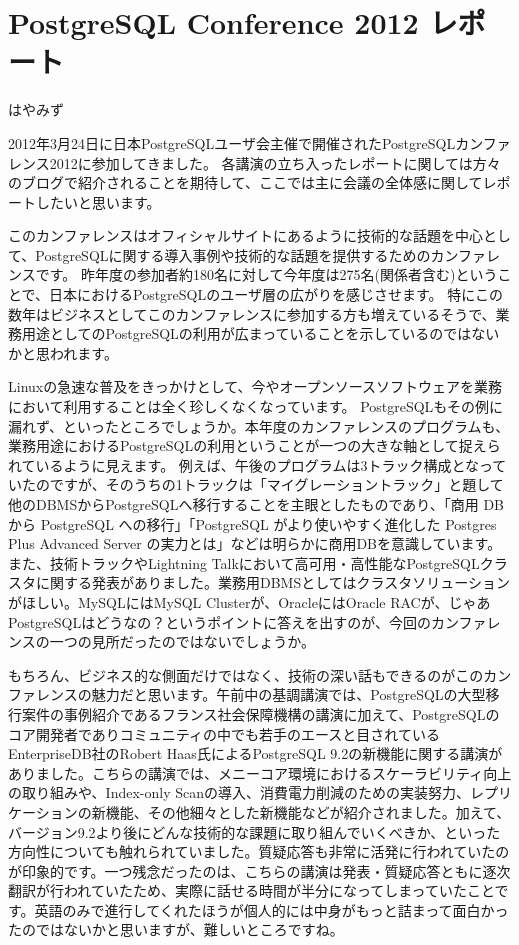 

\chapter{PostgreSQL Conference 2012 レポート}

\begin{flushright}
 はやみず
\end{flushright}

2012年3月24日に日本PostgreSQLユーザ会主催で開催されたPostgreSQLカンファレンス2012に参加してきました。 各講演の立ち入ったレポートに関しては方々のブログで紹介されることを期待して、ここでは主に会議の全体感に関してレポートしたいと思います。

このカンファレンスはオフィシャルサイトにあるように技術的な話題を中心として、PostgreSQLに関する導入事例や技術的な話題を提供するためのカンファレンスです。 昨年度の参加者約180名に対して今年度は275名(関係者含む)ということで、日本におけるPostgreSQLのユーザ層の広がりを感じさせます。 特にこの数年はビジネスとしてこのカンファレンスに参加する方も増えているそうで、業務用途としてのPostgreSQLの利用が広まっていることを示しているのではないかと思われます。

Linuxの急速な普及をきっかけとして、今やオープンソースソフトウェアを業務において利用することは全く珍しくなくなっています。 PostgreSQLもその例に漏れず、といったところでしょうか。本年度のカンファレンスのプログラムも、業務用途におけるPostgreSQLの利用ということが一つの大きな軸として捉えられているように見えます。 例えば、午後のプログラムは3トラック構成となっていたのですが、そのうちの1トラックは「マイグレーショントラック」と題して他のDBMSからPostgreSQLへ移行することを主眼としたものであり、「商用 DB から PostgreSQL への移行」「PostgreSQL がより使いやすく進化した Postgres Plus Advanced Server の実力とは」などは明らかに商用DBを意識しています。また、技術トラックやLightning Talkにおいて高可用・高性能なPostgreSQLクラスタに関する発表がありました。業務用DBMSとしてはクラスタソリューションがほしい。MySQLにはMySQL Clusterが、OracleにはOracle RACが、じゃあPostgreSQLはどうなの？というポイントに答えを出すのが、今回のカンファレンスの一つの見所だったのではないでしょうか。

もちろん、ビジネス的な側面だけではなく、技術の深い話もできるのがこのカンファレンスの魅力だと思います。午前中の基調講演では、PostgreSQLの大型移行案件の事例紹介であるフランス社会保障機構の講演に加えて、PostgreSQLのコア開発者でありコミュニティの中でも若手のエースと目されているEnterpriseDB社のRobert Haas氏によるPostgreSQL 9.2の新機能に関する講演がありました。こちらの講演では、メニーコア環境におけるスケーラビリティ向上の取り組みや、Index-only Scanの導入、消費電力削減のための実装努力、レプリケーションの新機能、その他細々とした新機能などが紹介されました。加えて、バージョン9.2より後にどんな技術的な課題に取り組んでいくべきか、といった方向性についても触れられていました。質疑応答も非常に活発に行われていたのが印象的です。一つ残念だったのは、こちらの講演は発表・質疑応答ともに逐次翻訳が行われていたため、実際に話せる時間が半分になってしまっていたことです。英語のみで進行してくれたほうが個人的には中身がもっと詰まって面白かったのではないかと思いますが、難しいところですね。

